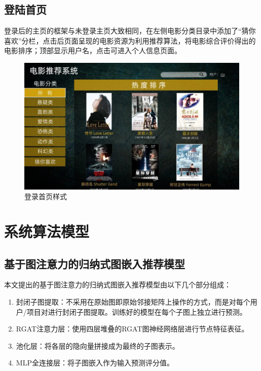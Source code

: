 \documentclass{ctexart}
\begin{document}
\subsection{登陆首页}
登录后的主页的框架与未登录主页大致相同，在左侧电影分类目录中添加了“猜你喜欢”分栏，点击后页面呈现的电影资源为利用推荐算法，将电影综合评价得出的电影排序；顶部显示用户名，点击可进入个人信息页面。
\begin {figure}[h]
\centering %
\includegraphics[width=\textwidth]{p4.jpg}
\caption{登录首页样式} %

\label{five}
\end {figure}

\section{系统算法模型}

\subsection{基于图注意力的归纳式图嵌入推荐模型}

本文提出的基于图注意力的归纳式图嵌入推荐模型由以下几个部分组成：
\begin{enumerate}
    \item 封闭子图提取：不采用在原始图即原始邻接矩阵上操作的方式，而是对每个用户/项目对进行封闭子图提取。训练好的模型在每个子图上独立进行预测。
    \item RGAT注意力层：使用四层堆叠的RGAT图神经网络层进行节点特征表征。
    \item 池化层：将各层的隐向量拼接成为最终的子图表示。
    \item MLP全连接层：将子图嵌入作为输入预测评分值。
\end{enumerate}
\end{document}
